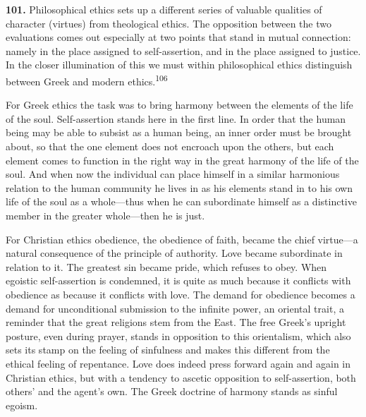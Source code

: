 \documentclass[12pt,a4paper]{book}
\newcommand{\opage}[1]{\marginnote{\footnotesize\textit{[#1]}}}
\begin{document}
\medskip

\noindent\textbf{101.} Philosophical ethics sets up a different series of valuable qualities of
character (virtues) from theological ethics. The opposition between the two evaluations comes out
especially at two points that stand in mutual connection: namely in the place assigned to
self-assertion, and in the place assigned to justice. In the closer illumination of this we must 
\opage{227}within
philosophical ethics distinguish between Greek and modern ethics.\textsuperscript{106}

For Greek ethics the task was to bring harmony between the elements of the life of the soul.
Self-assertion stands here in the first line. In order that the human being may be able to subsist as a
human being, an inner order must be brought about, so that the one element does not encroach upon the
others, but each element comes to function in the right way in the great harmony of the life of the
soul. And when now the individual can place himself in a similar harmonious relation to the human
community he lives in as his elements stand in to his own life of the soul as a whole---thus when he can
subordinate himself as a distinctive member in the greater whole---then he is just.

For Christian ethics obedience, the obedience of faith, became the chief virtue---a natural consequence
of the principle of authority. Love became subordinate in relation to it. The greatest sin became pride,
which refuses to obey. When egoistic self-assertion is condemned, it is quite as much because it
conflicts with obedience as because it conflicts with love. The demand for obedience becomes a demand
for unconditional submission to the infinite power, an oriental trait, a reminder that the great religions
stem from the East. The free Greek's upright posture, even during prayer, stands in opposition to this
orientalism, which also sets its stamp on the feeling of sinfulness and makes this different from the
ethical feeling of repentance. Love does indeed press forward again and again in Christian ethics, but
with a tendency to ascetic opposition to self-assertion, both others' and the agent's own. The Greek
doctrine of harmony stands as sinful egoism.
\end{document}
